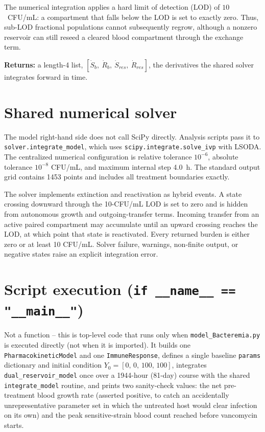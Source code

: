 \documentclass[11pt]{article}
\begin{document}
The numerical integration applies a hard limit of detection (LOD) of
$10$~CFU/mL: a compartment that falls below the LOD is set to exactly zero.
Thus, sub-LOD fractional populations cannot subsequently regrow, although a
nonzero reservoir can still reseed a cleared blood compartment through the
exchange term.

\textbf{Returns:} a length-4 list, $[\dot S_b,\ \dot R_b,\ \dot S_{res},\
\dot R_{res}]$, the derivatives the shared solver integrates forward in time.

\section{Shared numerical solver}

The model right-hand side does not call SciPy directly. Analysis scripts pass
it to \texttt{solver.integrate\_model}, which uses
\texttt{scipy.integrate.solve\_ivp} with LSODA. The centralized numerical
configuration is relative tolerance $10^{-6}$, absolute tolerance $10^{-8}$
CFU/mL, and maximum internal step 4.0~h. The standard output grid contains
1453 points and includes all treatment boundaries exactly.

The solver implements extinction and reactivation as hybrid events. A state
crossing downward through the 10-CFU/mL LOD is set to zero and is hidden from
autonomous growth and outgoing-transfer terms. Incoming transfer from an
active paired compartment may accumulate until an upward crossing reaches the
LOD, at which point that state is reactivated. Every returned burden is either
zero or at least 10 CFU/mL. Solver failure, warnings, non-finite output, or
negative states raise an explicit integration error.

\section{Script execution (\texttt{if \_\_name\_\_ == "\_\_main\_\_"})}

Not a function -- this is top-level code that runs only when
\texttt{model\_Bacteremia.py} is executed directly (not when it is
imported). It builds one \texttt{PharmacokineticModel} and one
\texttt{ImmuneResponse}, defines a single baseline \texttt{params}
dictionary and initial condition $Y_0 = [0,\,0,\,100,\,100]$, integrates
\texttt{dual\_reservoir\_model} once over a 1944-hour (81-day) course with
the shared \texttt{integrate\_model} routine, and prints two sanity-check
values: the net
pre-treatment blood growth rate (asserted positive, to catch an
accidentally unrepresentative parameter set in which the untreated host
would clear infection on its own) and the peak sensitive-strain blood count
reached before vancomycin starts.
\end{document}
